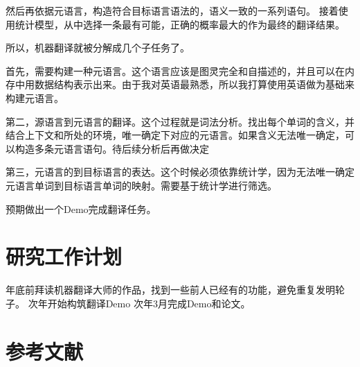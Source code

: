 \documentclass[12pt,a4paper]{article}
\begin{document}
\begin{onehalfspace}
然后再依据元语言，构造符合目标语言语法的，语义一致的一系列语句。 
接着使用统计模型，从中选择一条最有可能，正确的概率最大的作为最终的翻译结果。 \cite{STATMT}

所以，机器翻译就被分解成几个子任务了。 

首先，需要构建一种元语言。这个语言应该是图灵完全和自描述的，并且可以在内存中用数据结构表示出来。由于我对英语最熟悉，所以我打算使用英语做为基础来构建元语言。 

第二，源语言到元语言的翻译。这个过程就是词法分析。找出每个单词的含义，并结合上下文和所处的环境，唯一确定下对应的元语言。如果含义无法唯一确定，可以构造多条元语言语句。待后续分析后再做决定 

第三，元语言的到目标语言的表达。这个时候必须依靠统计学，因为无法唯一确定元语言单词到目标语言单词的映射。需要基于统计学进行筛选。 

预期做出一个Demo完成翻译任务。

\section{研究工作计划}

年底前拜读机器翻译大师的作品，找到一些前人已经有的功能，避免重复发明轮子。
次年开始构筑翻译Demo
次年3月完成Demo和论文。

\end{onehalfspace}

\section{参考文献}



\end{document}
